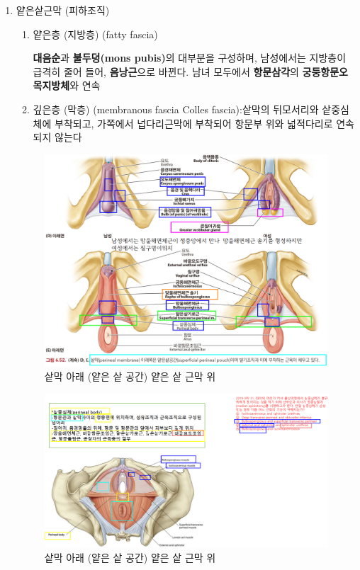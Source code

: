 \documentclass[10pt]{amsart}
\numberwithin{theorem}{section}
\numberwithin{example}{section}
\theoremstyle{definition}
\theoremstyle{remark}
\begin{document}
\begin{enumerate}
    \item 얕은샅근막 (피하조직)
    
   
    \begin{enumerate}
        \item 얕은층 (지방층) (fatty fascia)
        
        
         \textbf{대음순}과 \textbf{불두덩(mons pubis)}의 대부분을 구성하며, 남성에서는 지방층이 급격히 줄어
들어, \textbf{음낭근}으로 바뀐다. 남녀 모두에서 \textbf{항문삼각}의 \textbf{궁둥항문오목지방체}와 연속
        \item 깊은층 (막층) (membranous fascia Colles fascia):샅막의 뒤모서리와 샅중심체에 부착되고, 가쪽에서 넙다리근막에 부착되어 항문부
위와 넓적다리로 연속되지 않는다
    \end{enumerate}
    
    \begin{figure}[H]
    \centering
    \includegraphics[width=.9\textwidth]{pf2.png}
    \caption{샅막 아래 (얕은 샅 공간)  얕은 샅 근막 위 }
    \label{fig:pf2}
\end{figure}


\begin{figure}[H]
    \centering
    \includegraphics[width=.95\textwidth]{pm1.png}
    \caption{샅막 아래 (얕은 샅 공간) 얕은 샅 근막 위}
    \label{fig:pm1}
\end{figure}


\end{enumerate}
\end{document}
